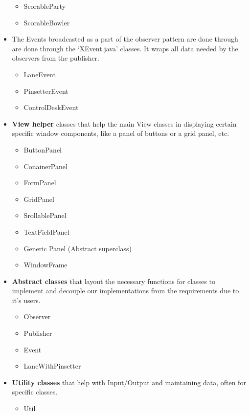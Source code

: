 \begin{itemize}
\begin{itemize}
              \item ScorableParty
              \item ScorableBowler
          \end{itemize}
    \item The Events broadcasted as a part of the observer pattern are done through are done through the `XEvent.java' classes. It wraps all data needed by the observers from the publisher.
          \begin{itemize}
              \item LaneEvent
              \item PinsetterEvent
              \item ControlDeskEvent
          \end{itemize}
    \item \textbf{View helper} classes that help the main View classes in displaying certain specific window components, like a panel of buttons or a grid panel, etc.
          \begin{itemize}
              \item ButtonPanel
              \item ConainerPanel
              \item FormPanel
              \item GridPanel
              \item SrollablePanel
              \item TextFieldPanel
              \item Generic Panel (Abstract superclass)
              \item WindowFrame
          \end{itemize}
    \item \textbf{Abstract classes} that layout the necessary functions for classes to implement and decouple our implementations from the requirements due to it's users.
          \begin{itemize}
              \item Observer
              \item Publisher
              \item Event
              \item LaneWithPinsetter
          \end{itemize}
    \item \textbf{Utility classes} that help with Input/Output and maintaining data, often for specific classes.
          \begin{itemize}
              \item Util

\end{itemize}
\end{itemize}
